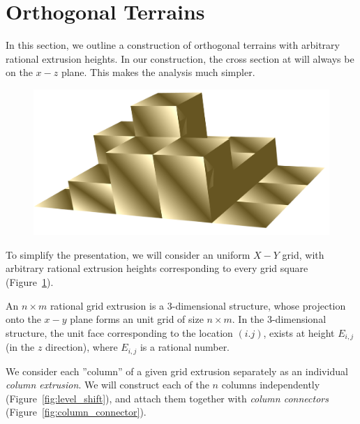 \section{Orthogonal Terrains}
\label{sec:orthogonal_terrains}

In this section, we outline a construction of orthogonal terrains with arbitrary rational extrusion heights.
In our construction, the cross section at will always be on the $x-z$ plane.
This makes the analysis much simpler.
\begin{figure}
    \includegraphics[width=\linewidth]{figures/terrain.png}
    \label{fig:terrain}
    \caption{}
    \vspace{-1.6em}
\end{figure}

To simplify the presentation, we will consider an uniform $X-Y$ grid,
with arbitrary rational extrusion heights corresponding to every grid square (Figure~\ref{fig:terrain}).
\begin{definition}
An $n\times m$ rational grid extrusion is a 3-dimensional structure,
whose projection onto the $x-y$ plane forms an unit grid of size $n\times m$.
In the 3-dimensional structure, the unit face corresponding to the location $(i.j)$,
exists at height $E_{i,j}$ (in the $z$ direction), where $E_{i,j}$ is a rational number.
\end{definition}

We consider each ''column'' of a given grid extrusion separately as an individual \emph{column extrusion}.
We will construct each of the $n$ columns independently (Figure~\ref{fig:level_shift}),
and attach them together with \emph{column connectors} (Figure~\ref{fig:column_connector}).

\graphicspath{{./figures/}}
\begin{figure}
    \def\svgwidth{0.6\textwidth}
    \label{fig:column_extrusion}
    \caption{}
    \vspace{-1.3em}
\end{figure}

